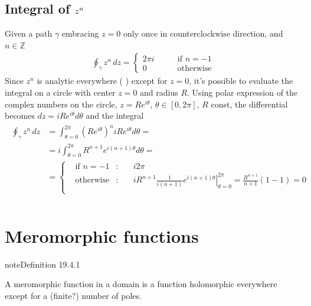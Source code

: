 \documentclass[letterpaper,10pt,english]{jupyterBook}
\begin{document}
\subsection{Integral of \protect\(z^n\protect\)}
\label{\detokenize{ch/complex/analysis:integral-of-z-n}}\label{\detokenize{ch/complex/analysis:complex-analysis-useful-int-path-independence-z-n}}
\sphinxAtStartPar
Given a path \(\gamma\) embracing \(z=0\) only once in counter\sphinxhyphen{}clockwise direction, and \(n \in \mathbb{Z}\)
\begin{equation*}
\begin{split}\oint_{\gamma} z^n \, dz = \left\{ \begin{aligned}  2 \pi i & \qquad \text{if $n = -1$} \\ 0 & \qquad \text{otherwise} \end{aligned} \right.\end{split}
\end{equation*}
\sphinxAtStartPar
Since \(z^n\) is analytic everywhere ( ) except for \(z=0\), it’s possible to evaluate the integral on a circle with center \(z=0\) and radius \(R\). Using polar expression of the complex numbers on the circle, \(z = R e^{i \theta}\), \(\theta \in [0, 2 \pi]\), \(R\) const, the differential becomes \(dz = i R e^{i \theta} d \theta\) and the integral
\begin{equation*}
\begin{split}\begin{aligned}
\oint_{\gamma} z^n \, dz
  & = \int_{\theta=0}^{2 \pi} \left( R e^{i\theta}\right)^n i R e^{i \theta} d \theta = \\
  & = i \int_{\theta=0}^{2 \pi} R^{n+1} e^{i (n+1) \theta} d \theta = \\
  & = \left\{ \begin{aligned}
    & \text{if $n=-1$} & : & \quad  i 2 \pi \\
    & \text{otherwise} & : & \quad  i R^{n+1} \frac{1}{i(n+1)} \left.e^{i(n+1)\theta}\right|_{\theta=0}^{2\pi} = \frac{R^{n+1}}{n+1} ( 1 - 1 ) = 0 \\
  \end{aligned} \right.\\
\end{aligned}\end{split}
\end{equation*}

\section{Meromorphic functions}
\label{\detokenize{ch/complex/analysis:meromorphic-functions}}\label{\detokenize{ch/complex/analysis:complex-analysis-mero-fun}}\label{ch/complex/analysis:definition-1}
\begin{sphinxadmonition}{note}{Definition 19.4.1}



\sphinxAtStartPar
A meromorphic function in a domain is a function holomorphic everywhere except for a (finite?) number of poles. 
\end{sphinxadmonition}
\end{document}
